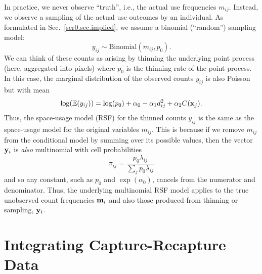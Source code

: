 In practice, we never observe ``truth'', i.e., the actual use
frequencies $m_{ij}$. Instead, we observe a sampling of the actual use
outcomes by an individual.  As formulated in
Sec.~\ref{scr0.sec.implied}, we assume a binomial (``random'')
sampling model:
\[
 y_{ij} \sim \mbox{Binomial}(m_{ij}, p_{0}).
\]
We can think of these counts as arising by thinning the underlying
point process (here, aggregated into pixels) where $p_{0}$ is the
thinning rate of the point process.  In this case, the marginal
distribution of the observed counts $y_{ij}$ is also Poisson but with mean
\[
 \log(\mathbb{E}(y_{ij}))  = \log(p_{0}) + \alpha_{0} -\alpha_{1} d_{ij}^{2} +  \alpha_{2} C({\bf x}_{j}).
\]
Thus, the space-usage model (RSF) for the thinned counts $y_{ij}$ is
the same as the space-usage model for the original variables $m_{ij}$.
This is because if we remove $m_{ij}$ from the conditional model by
summing over its possible values, then the vector ${\bf y}_{i}$ is
{\it also} multinomial with cell probabilities
\[
\pi_{ij} = \frac{p_{0}\lambda_{ij}}{\sum_{j} p_{0} \lambda_{ij}}
\]
and so any constant, such as $p_{0}$ and $\exp(\alpha_{0})$, cancels
from the numerator and denominator. Thus, the underlying multinomial
RSF model applies to the true unobserved count frequencies ${\bf
  m}_{i}$ and also those produced from thinning or sampling, ${\bf
  y}_{i}$.





\section{Integrating Capture-Recapture Data}

